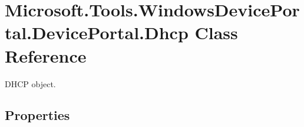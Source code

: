 \hypertarget{class_microsoft_1_1_tools_1_1_windows_device_portal_1_1_device_portal_1_1_dhcp}{}\section{Microsoft.\+Tools.\+Windows\+Device\+Portal.\+Device\+Portal.\+Dhcp Class Reference}
\label{class_microsoft_1_1_tools_1_1_windows_device_portal_1_1_device_portal_1_1_dhcp}


D\+H\+CP object.  


\subsection*{Properties}
